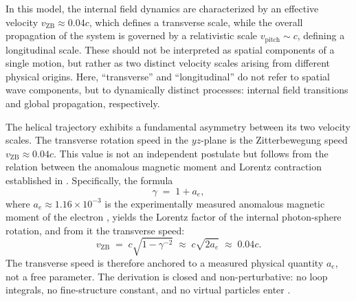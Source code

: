 \documentclass[%
 reprint, amsmath,amssymb, aps, prb, ]{revtex4-2}
\numberwithin{equation}{section}
\begin{document}
In this model, the internal field dynamics are characterized by an effective velocity $v_{\mathrm{ZB}} \approx 0.04c$, which defines a transverse scale, while the overall propagation of the system is governed by a relativistic scale $v_{\mathrm{pitch}} \sim c$, defining a longitudinal scale. These should not be interpreted as spatial components of a single motion, but rather as two distinct velocity scales arising from different physical origins. Here, ``transverse'' and ``longitudinal'' do not refer to spatial wave components, but to dynamically distinct processes: internal field transitions and global propagation, respectively.

\vspace{5mm}

The helical trajectory exhibits a fundamental asymmetry between its two velocity scales. The transverse rotation speed in the $yz$-plane is the Zitterbewegung speed $v_{\mathrm{ZB}} \approx 0.04c$. This value is not an independent postulate but follows from the relation between the anomalous magnetic moment and Lorentz contraction established in \cite{hanamura10}. Specifically, the formula
\begin{equation}
\gamma \;=\; 1 + a_e,
\label{eq:gamma_ae}
\end{equation}
where $a_e \approx 1.16\times10^{-3}$ is the experimentally measured anomalous magnetic moment of the electron \cite{hanamura10, hanamura36}, yields the Lorentz factor of the internal photon-sphere rotation, and from it the transverse speed:
\begin{equation}
v_{\mathrm{ZB}} \;=\; c\sqrt{1 - \gamma^{-2}} \;\approx\; c\sqrt{2a_e} \;\approx\; 0.04c.
\label{eq:vzb_from_ae}
\end{equation}
The transverse speed is therefore anchored to a measured physical quantity $a_e$, not a free parameter. The derivation is closed and non-perturbative: no loop integrals, no fine-structure constant, and no virtual particles enter \cite{hanamura36}.
\end{document}
